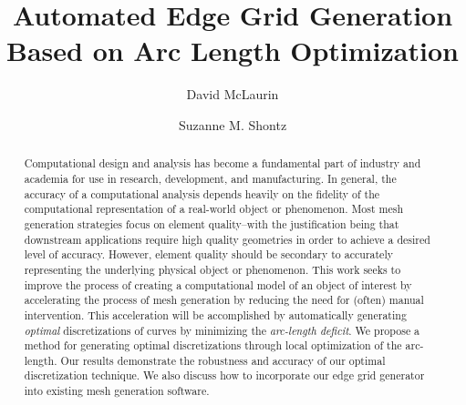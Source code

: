 \documentclass{svmult}
\begin{document}
\title*{Automated Edge Grid Generation Based on Arc Length Optimization}
\author{David McLaurin\and
Suzanne M. Shontz}
%
%
\maketitle

\begin{abstract}
Computational design and analysis has become a fundamental part of 
industry and academia for use in research, development, and manufacturing.  
In general, the accuracy of a computational analysis depends heavily on 
the fidelity of the computational representation of a real-world object or 
phenomenon. Most mesh generation strategies focus on element quality--with 
the justification being that downstream applications require high quality 
geometries in order to achieve a desired level of accuracy. However, 
element quality should be secondary to accurately representing the 
underlying physical object or phenomenon.  This work seeks to improve the 
process of creating a computational model of an object of interest by 
accelerating the process of mesh generation by reducing the need for 
(often) manual intervention. This acceleration will be accomplished by 
automatically generating \textit{optimal} discretizations of curves by 
minimizing the \textit{arc-length deficit}.  We propose a method for
generating optimal discretizations through local optimization of the 
arc-length.  Our results demonstrate the robustness and accuracy of
our optimal discretization technique.  We also discuss how to incorporate 
our edge grid generator into existing mesh generation software.
\end{abstract}
\end{document}
